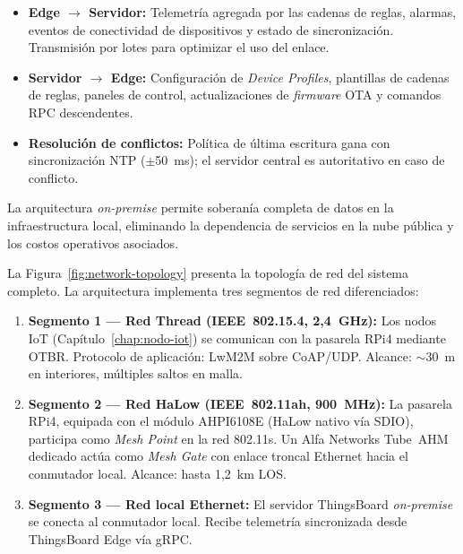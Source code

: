 \begin{itemize}
    \item \textbf{Edge $\rightarrow$ Servidor:} Telemetría agregada por las cadenas de reglas, alarmas, eventos de conectividad de dispositivos y estado de sincronización.  Transmisión por lotes para optimizar el uso del enlace.
    \item \textbf{Servidor $\rightarrow$ Edge:} Configuración de \emph{Device Profiles}, plantillas de cadenas de reglas, paneles de control, actualizaciones de \emph{firmware} OTA y comandos RPC descendentes.
    \item \textbf{Resolución de conflictos:} Política de última escritura gana con sincronización NTP ($\pm$50~ms); el servidor central es autoritativo en caso de conflicto.
\end{itemize}

La arquitectura \emph{on-premise} permite soberanía completa de datos en la infraestructura local, eliminando la dependencia de servicios en la nube pública y los costos operativos asociados.


\label{sec:gateway-topologia-general}

La Figura~\ref{fig:network-topology} presenta la topología de red del sistema completo.  La arquitectura implementa tres segmentos de red diferenciados:



\begin{enumerate}
    \item \textbf{Segmento 1 --- Red Thread (IEEE~802.15.4, 2,4~GHz):} Los nodos IoT (Capítulo~\ref{chap:nodo-iot}) se comunican con la pasarela RPi4 mediante OTBR.  Protocolo de aplicación: LwM2M sobre CoAP/UDP.  Alcance: $\sim$30~m en interiores, múltiples saltos en malla.

    \item \textbf{Segmento 2 --- Red HaLow (IEEE~802.11ah, 900~MHz):} La pasarela RPi4, equipada con el módulo AHPI6108E (HaLow nativo vía SDIO), participa como \emph{Mesh Point} en la red 802.11s.  Un Alfa Networks Tube~AHM dedicado actúa como \emph{Mesh Gate} con enlace troncal Ethernet hacia el conmutador local.  Alcance: hasta 1,2~km LOS.

    \item \textbf{Segmento 3 --- Red local Ethernet:} El servidor ThingsBoard \emph{on-premise} se conecta al conmutador local.  Recibe telemetría sincronizada desde ThingsBoard Edge vía gRPC.
\end{enumerate}


